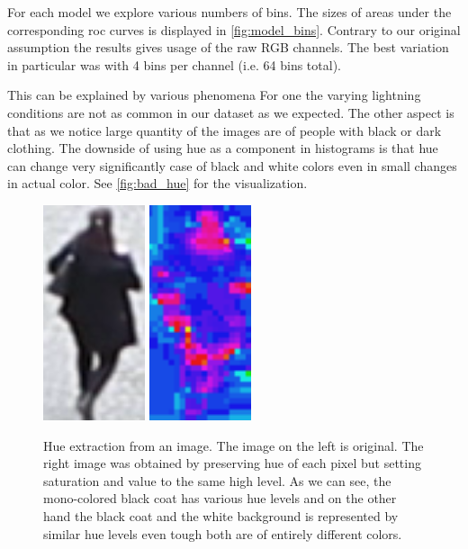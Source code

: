 For each model we explore various numbers of bins. The sizes of areas under the corresponding \gls{roc} curves is displayed in \autoref{fig:model_bins}. Contrary to our original
assumption the results gives usage of the raw RGB channels. The best variation in particular was with 4 bins per channel (i.e. 64 bins total).

This can be explained by various phenomena For one the varying lightning
conditions are not as common in our dataset as we expected. The other aspect
is that as we notice large quantity of the images are of people with black or
dark clothing. The downside of using hue as a component in histograms is that
hue can change very significantly case of black and white colors even in small
changes in actual color. See \autoref{fig:bad_hue} for the visualization.

\begin{figure}
    \centering
    \includegraphics[width=3cm]{img/bad_hue_orig.png}
    \includegraphics[width=3cm]{img/bad_hue_hue.png}
    \caption[Hue extraction from an image]{Hue extraction from an image. The image on the left is original. The right image was obtained by preserving hue of each pixel but setting saturation and value to the same high level. As we can see, the mono-colored black coat has various hue levels and on the other hand the black coat and the white background is represented by similar hue levels even tough both are of entirely different colors.}
    \label{fig:bad_hue}
\end{figure}

